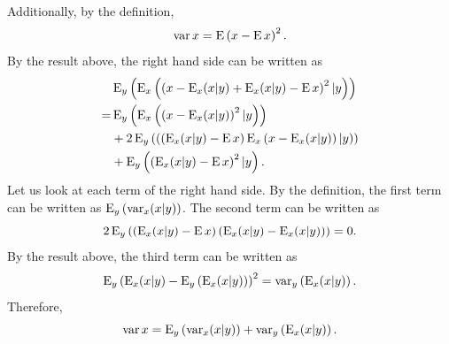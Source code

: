 Additionally, by the definition,
%
\begin{equation}
\operatorname{var} x 
= 
\operatorname{E} 
\left( 
	x 
	- 
	\operatorname{E} x 
\right) ^ 2.
\end{equation}
%
By the result above, the right hand side can be written as
%
\begin{equation}
\begin{aligned}
&
\operatorname{E}_y 
\left( 
	\operatorname{E}_x 
	\left( 
		\left( 
			x 
			- 
			\operatorname{E}_x (x | y) 
			+ 
			\operatorname{E}_x (x | y) 
			- 
			\operatorname{E} x 
		\right) ^ 2 
		| 
		y 
	\right) 
\right) \\
=& 
\operatorname{E}_y 
\left( 
	\operatorname{E}_x 
	\left( 
		\left( 
			x 
			- 
			\operatorname{E}_x (x | y) 
		\right) ^ 2 
		| 
		y 
	\right) 
\right) 
\\
&
+ 
2 
\operatorname{E}_y 
\left( 
	\left(
	\left( 
		\operatorname{E}_x (x | y) 
		- 
		\operatorname{E} x 
	\right) 
	\operatorname{E}_x 
	\left(
		x 
		- 
		\operatorname{E}_x (x | y) 
	\right)
	|
	y
	\right)  
\right) 
\\
&+ 
\operatorname{E}_y 
\left( 
	\left( 
		\operatorname{E}_x (x | y) 
		- 
		\operatorname{E} x 
	\right) ^ 2 
	| 
	y 
\right).
\end{aligned}
\end{equation}
%
Let us look at each term of the right hand side.
By the definition, the first term can be written as $\operatorname{E}_y \left( \operatorname{var}_x (x | y) \right)$.
The second term can be written as
%
\begin{equation}
2 
\operatorname{E}_y 
\left( 
	\left( 
		\operatorname{E}_x (x | y) 
		- 
		\operatorname{E} x 
	\right) 
	\left(
		\operatorname{E}_x (x | y) 
		- 
		\operatorname{E}_x (x | y) 
	\right)
\right)
=
0.
\end{equation}
%
By the result above, the third term can be written as
%
\begin{equation}
\operatorname{E}_y 
\left( 
	\operatorname{E}_x (x | y) 
	- 
	\operatorname{E}_y 
	\left( 
		\operatorname{E}_x (x | y) 
	\right) 
\right) ^ 2 
= 
\operatorname{var}_y 
\left( 
	\operatorname{E}_x (x | y) 
\right).
\end{equation}
%
Therefore,
%
\begin{equation}
\operatorname{var} x 
= 
\operatorname{E}_y 
\left( 
	\operatorname{var}_x (x | y) 
\right) 
+ 
\operatorname{var}_y 
\left( 
	\operatorname{E}_x (x | y) 
\right).
\end{equation}
%


